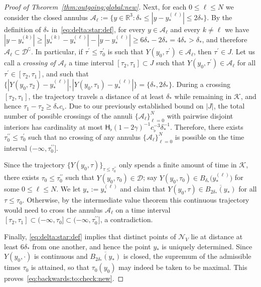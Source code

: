 \documentclass[11pt,reqno]{amsproc}
\numberwithin{equation}{section}
\theoremstyle{remark}
\begin{document}
\begin{proof}[Proof of Theorem~\ref{thm:outgoing:global:new}]
Next, for each $0 \leq \ell \leq N$ we consider the closed annulus $\mathcal{A}_\ell := \{ y \in \mathbb{R}^3 \colon \delta_* \leq |y-y_*^{(\ell)}| \leq 2\delta_* \}$. By the definition of $\delta_*$ in~\eqref{eq:delta:star:def}, for every $y \in \mathcal{A}_\ell$ and every $k \neq \ell$ we have $|y - y_*^{(k)}| \geq |y_*^{(k)} - y_*^{(\ell)}| - |y - y_*^{(\ell)}| \geq 6\delta_* - 2\delta_* = 4\delta_* > \delta_*$, and therefore $\mathcal{A}_\ell \subset \mathcal{D}^\complement$. In particular, if $\tau^\prime \leq \tau_0^\prime$ is such that $Y(y_0,\tau^\prime) \in \mathcal{A}_\ell$, then $\tau^\prime \in J$. Let us call a {\em crossing of $\mathcal{A}_\ell$} a time interval $[\tau_2,\tau_1] \subset J$ such that $Y(y_0,\tau^\prime) \in \mathcal{A}_\ell$ for all $\tau^\prime \in [\tau_2,\tau_1]$, and such that $\{ |Y(y_0,\tau_2) - y_*^{(\ell)}| , |Y(y_0,\tau_1) - y_*^{(\ell)}| \} = \{\delta_*, 2\delta_*\}$. During a crossing $[\tau_2,\tau_1]$, the trajectory travels a distance of at least $\delta_*$ while remaining in $\mathcal{K}$, and hence $\tau_1 - \tau_2 \geq \delta_* c_\flat$. Due to our previously established bound on $|J|$, the total number of possible crossings of the annuli $\{\mathcal{A}_\ell\}_{\ell=0}^{N}$ with pairwise disjoint interiors has cardinality at most $\mathsf{H}_\flat (1-2\gamma)^{-1} c_\flat^{-3} \delta_*^{-1}$. Therefore, there exists $\tau_0^{\prime\prime} \leq \tau_0^\prime$ such that no crossing of any annulus $\{\mathcal{A}_\ell\}_{\ell=0}^{N}$ is possible on the time interval $(-\infty,\tau_0^{\prime\prime}]$.

Since the trajectory $\{ Y(y_0,\tau) \}_{\tau \leq \tau_0^{\prime\prime}}$ only spends a finite amount of time in $\mathcal{K}$, there exists $\tau_0 \leq \tau_0^{\prime\prime}$ such that $Y(y_0,\tau_0) \in \mathcal{D}$; say $Y(y_0,\tau_0) \in B_{\delta_*}\bigl(y_*^{(\ell)}\bigr)$ for some $0 \leq \ell \leq N$. We let $y_* := y_*^{(\ell)}$ and claim that $Y(y_0,\tau) \in \overline{B_{2\delta_*}(y_*)}$ for all $\tau \leq \tau_0$. Otherwise, by the intermediate value theorem this continuous trajectory would need to cross the annulus $\mathcal{A}_\ell$ on a time interval $[\tau_2,\tau_1] \subset (-\infty,\tau_0] \subset (-\infty,\tau_0^{\prime\prime}]$, a contradiction. 

Finally, \eqref{eq:delta:star:def} implies that distinct points of $\mathcal{N}_V$ lie at distance at least $6\delta_*$ from one another, and hence the point $y_*$ is uniquely determined. Since $Y(y_0,\cdot)$ is continuous and $\overline{B_{2\delta_*}(y_*)}$ is closed, the supremum of the admissible times $\tau_0$ is attained, so that $\tau_0(y_0)$ may indeed be taken to be maximal. This proves~\eqref{eq:backwards:to:check:new}.


\end{proof}
\end{document}
